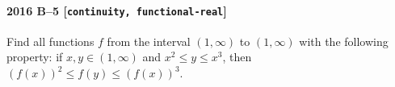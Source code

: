 \paragraph{2016 B--5 \textnormal{[\texttt{continuity, functional-real}]}}
Find all functions $f$ from the interval $(1, \infty)$ to $(1, \infty)$ with the following property:
if $x,y \in (1, \infty)$ and $x^2 \leq y \leq x^3$, then $(f(x))^2 \leq f(y) \leq (f(x))^3$.
